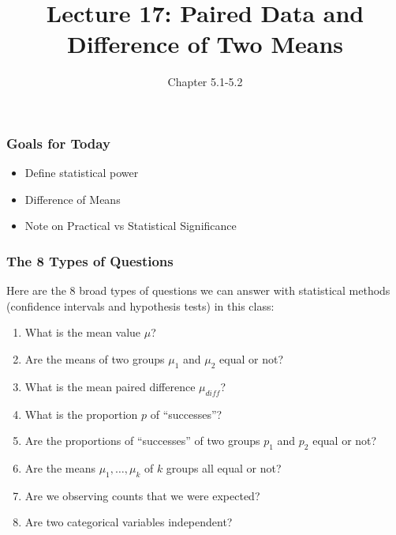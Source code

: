 \documentclass[slides]{beamer}
\title{Lecture 17: Paired Data and Difference of Two Means}
\author{Chapter 5.1-5.2}
\date{}
\newcommand{\blue}[1]{\textcolor{blue2}{#1}}
\begin{document}
\begin{frame}
\titlepage
\end{frame}



\begin{frame}[fragile]
\frametitle{Goals for Today}

\begin{itemize}
\item Define statistical power
\item Difference of Means
\item Note on Practical vs Statistical Significance
\end{itemize}

\end{frame}






\begin{frame}
\frametitle{The 8 Types of Questions}

Here are the 8 broad types of questions we can answer with statistical methods (confidence intervals and hypothesis tests) in this class: 

\vspace{0.25cm}

\begin{enumerate}
\pause\item What is the mean value $\mu$?
\pause\item Are the means of two groups $\mu_1$ and $\mu_2$ equal or not?
\pause\item What is the mean paired difference $\mu_{diff}$?
\pause\item What is the proportion $p$ of ``successes''?
\pause\item Are the proportions of ``successes'' of two groups $p_1$ and $p_2$ equal or not?
\pause\item Are the means $\mu_1, \ldots, \mu_k$ of $k$ groups \blue{all} equal or not?
\pause\item Are we observing counts that we were expected?
\pause\item Are two categorical variables independent?
\end{enumerate}

\end{frame}
\end{document}
